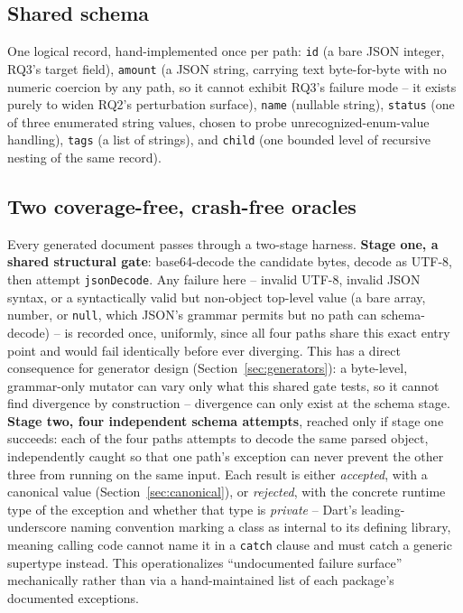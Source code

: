 \subsection{Shared schema}
\label{sec:schema}
One logical record, hand-implemented once per path: \texttt{id} (a bare JSON
integer, RQ3's target field), \texttt{amount} (a JSON string, carrying text
byte-for-byte with no numeric coercion by any path, so it cannot exhibit
RQ3's failure mode -- it exists purely to widen RQ2's perturbation surface),
\texttt{name} (nullable string), \texttt{status} (one of three enumerated
string values, chosen to probe unrecognized-enum-value handling), \texttt{tags}
(a list of strings), and \texttt{child} (one bounded level of recursive
nesting of the same record).

\subsection{Two coverage-free, crash-free oracles}
\label{sec:oracles}
Every generated document passes through a two-stage harness. \textbf{Stage
one, a shared structural gate}: base64-decode the candidate bytes, decode as
UTF-8, then attempt \texttt{jsonDecode}. Any failure here -- invalid UTF-8,
invalid JSON syntax, or a syntactically valid but non-object top-level value
(a bare array, number, or \texttt{null}, which JSON's grammar permits but no
path can schema-decode) -- is recorded once, uniformly, since all four paths
share this exact entry point and would fail identically before ever
diverging. This has a direct consequence for generator design
(Section~\ref{sec:generators}): a byte-level, grammar-only mutator can vary
only what this shared gate tests, so it cannot find divergence by
construction -- divergence can only exist at the schema stage. \textbf{Stage
two, four independent schema attempts}, reached only if stage one succeeds:
each of the four paths attempts to decode the same parsed object,
independently caught so that one path's exception can never prevent the
other three from running on the same input. Each result is either
\emph{accepted}, with a canonical value (Section~\ref{sec:canonical}), or
\emph{rejected}, with the concrete runtime type of the exception and whether
that type is \emph{private} -- Dart's leading-underscore naming convention
marking a class as internal to its defining library, meaning calling code
cannot name it in a \texttt{catch} clause and must catch a generic
supertype instead. This operationalizes ``undocumented failure surface''
mechanically rather than via a hand-maintained list of each package's
documented exceptions.

